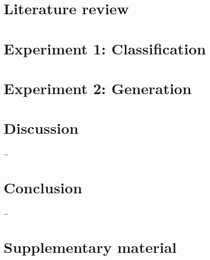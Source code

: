 \documentclass{report}
\begin{document}
\chapter{Literature review}


\chapter{Experiment 1: Classification}








\chapter{Experiment 2: Generation}









% 


% 


% 

% 

% 

\chapter{Discussion}
\dots

\chapter{Conclusion}
\dots

\newpage
\singlespacing



\newpage
\doublespacing
\appendix
\chapter{Supplementary material}

\end{document}
